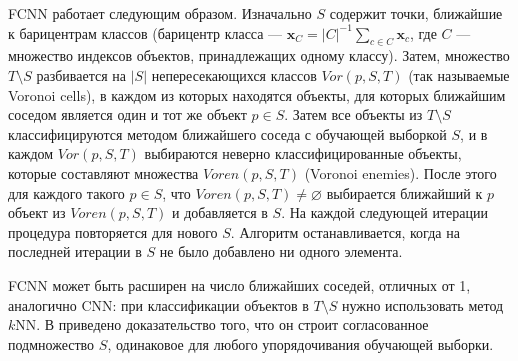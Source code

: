 FCNN работает следующим образом. Изначально \(S\) содержит точки, ближайшие к барицентрам классов (барицентр класса --- \(\mathbf{x}_C=|C|^{-1}\sum_{c\in C}\mathbf{x}_c\), где \(C\) --- множество индексов объектов, принадлежащих одному классу). Затем, множество \(T\setminus S\) разбивается на \(|S|\) непересекающихся классов \(Vor(p, S, T)\) (так называемые Voronoi cells), в каждом из которых находятся объекты, для которых ближайшим соседом является один и тот же объект \(p\in S\). Затем все объекты из \(T\setminus S\) классифицируются методом ближайшего соседа с обучающей выборкой \(S\), и в каждом \(Vor(p, S, T)\) выбираются неверно классифицированные объекты, которые составляют множества \(Voren(p, S, T)\) (Voronoi enemies). После этого для каждого такого \(p\in S\), что \(Voren(p, S, T)\neq\varnothing\) выбирается ближайший к \(p\) объект из \(Voren(p, S, T)\) и добавляется в \(S\). На каждой следующей итерации процедура повторяется для нового \(S\). Алгоритм останавливается, когда на последней итерации в \(S\) не было добавлено ни одного элемента.

FCNN может быть расширен на число ближайших соседей, отличных от 1, аналогично CNN: при классификации объектов в \(T\setminus S\) нужно использовать метод \(k\)NN. В \cite{angiulli} приведено доказательство того, что он строит согласованное подмножество \(S\), одинаковое для любого упорядочивания обучающей выборки.

